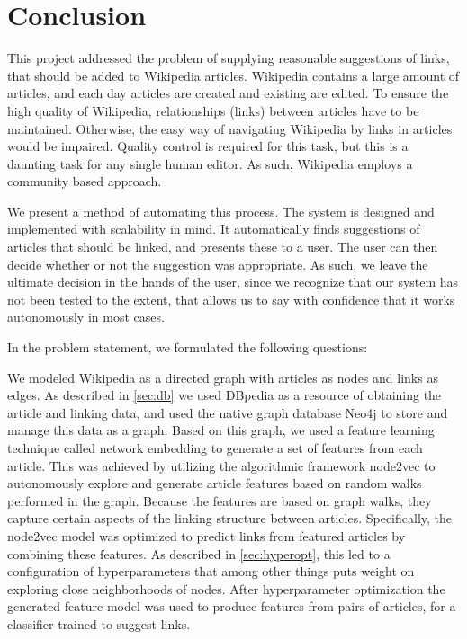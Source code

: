 \chapter{Conclusion}\label{chap:conclusion}
This project addressed the problem of supplying reasonable suggestions of links, that should be added to Wikipedia articles. Wikipedia contains a large amount of articles, and each day articles are created and existing are edited. To ensure the high quality of Wikipedia, relationships (links) between articles have to be maintained. Otherwise, the easy way of navigating Wikipedia by links in articles would be impaired. Quality control is required for this task, but this is a daunting task for any single human editor. As such, Wikipedia employs a community based approach. 

We present a method of automating this process. The system is designed and implemented with scalability in mind. It automatically finds suggestions of articles that should be linked, and presents these to a user. The user can then decide whether or not the suggestion was appropriate. As such, we leave the ultimate decision in the hands of the user, since we recognize that our system has not been tested to the extent, that allows us to say with confidence that it works autonomously in most cases.

In the problem statement, we formulated the following questions:

\subproblems

We modeled Wikipedia as a directed graph with articles as nodes and links as edges. As described in \cref{sec:db} we used DBpedia as a resource of obtaining the article and linking data, and used the native graph database Neo4j to store and manage this data as a graph. Based on this graph, we used a feature learning technique called network embedding to generate a set of features from each article. This was achieved by utilizing the algorithmic framework node2vec to autonomously explore and generate article features based on random walks performed in the graph. Because the features are based on graph walks, they capture certain aspects of the linking structure between articles. Specifically, the node2vec model was optimized to predict links from featured articles by combining these features. As described in \cref{sec:hyperopt}, this led to a configuration of hyperparameters that among other things puts weight on exploring close neighborhoods of nodes. After hyperparameter optimization the generated feature model was used to produce features from pairs of articles, for a classifier trained to suggest links.

